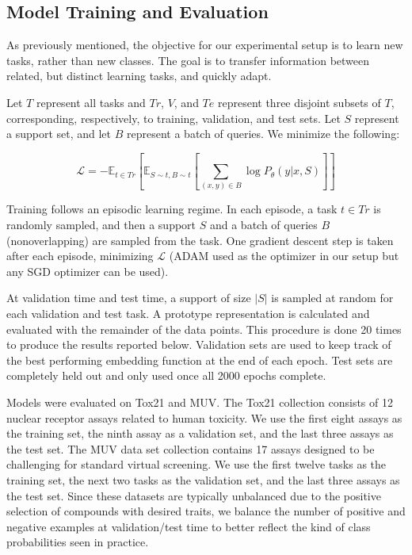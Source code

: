 \documentclass{article}
\begin{document}
\subsection{Model Training and Evaluation}

As previously mentioned, the objective for our experimental setup is to learn new tasks, rather than new classes.  The goal is to transfer information between related, but distinct learning tasks, and quickly adapt.  

Let $T$ represent all tasks and $Tr$, $V$, and $Te$ represent three disjoint subsets of $T$, corresponding, respectively, to training, validation, and test sets.  Let $S$ represent a support set, and let $B$ represent a batch of queries.  We minimize the following:

    $$\mathcal{L} = -\mathbb{E}_{t\in Tr}\left[\mathbb{E}_{S\sim t, B\sim t}\left[\sum_{(x,y)\in B}\log{P_{\theta}(y|x, S)}\right]\right]$$
    
Training follows an episodic learning regime.  In each episode, a task $t\in Tr$ is randomly sampled, and then a support $S$ and a batch of queries $B$ (nonoverlapping) are sampled from the task.  One gradient descent step is taken after each episode, minimizing $\mathcal{L}$ (ADAM used as the optimizer in our setup but any SGD optimizer can be used).

At validation time and test time, a support of size $|S|$ is sampled at random for each validation and test task.  A prototype representation is calculated and evaluated with the remainder of the data points.  This procedure is done 20 times to produce the results reported below.  Validation sets are used to keep track of the best performing embedding function at the end of each epoch.  Test sets are completely held out and only used once all 2000 epochs complete. 

Models were evaluated on Tox21 and MUV.   The Tox21 collection consists of 12 nuclear receptor assays related to human toxicity.  We use the first eight assays as the training set, the ninth assay as a validation set, and the last three assays as the test set.  The MUV data set collection contains 17 assays designed to be challenging for standard virtual screening.  We use the first twelve tasks as the training set, the next two tasks as the validation set, and the last three assays as the test set.  Since these datasets are typically unbalanced due to the positive selection of compounds with desired traits, we balance the number of positive and negative examples at validation/test time to better reflect the kind of class probabilities seen in practice. 
\end{document}

